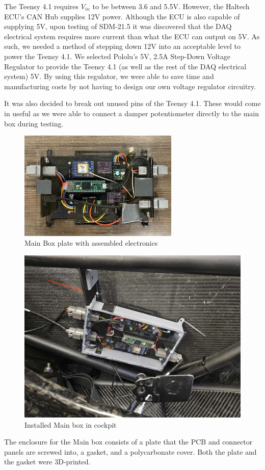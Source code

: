 The Teensy 4.1 requires $V_{in}$ to be between 3.6 and 5.5V.
However, the Haltech ECU's CAN Hub supplies 12V power.
Although the ECU is also capable of supplying 5V, upon testing of SDM-21.5 it was discovered that the DAQ electrical system requires more current than what the ECU can output on 5V.
As such, we needed a method of stepping down 12V into an acceptable level to power the Teensy 4.1.
We selected Pololu's 5V, 2.5A Step-Down Voltage Regulator to provide the Teensy 4.1 (as well as the rest of the DAQ electrical system) 5V.
By using this regulator, we were able to save time and manufacturing costs by not having to design our own voltage regulator circuitry.
\vspace{1em}

It was also decided to break out unused pins of the Teensy 4.1.
These would come in useful as we were able to connect a damper potentiometer directly to the main box during testing.
\begin{figure}[H]
    \centering
    \includegraphics[width=3in,angle=90]{images/main.jpg}
    \caption{Main Box plate with assembled electronics}
    \label{fig:sdm23mainbox}
\end{figure}
\begin{figure}[H]
    \centering
    \includegraphics[width=5in]{images/asdf.jpg}
    \caption{Installed Main box in cockpit}
    \label{fig:main}
\end{figure}
The enclosure for the Main box consists of a plate that the PCB and connector panels are screwed into, a gasket, and a polycarbonate cover.
Both the plate and the gasket were 3D-printed.


